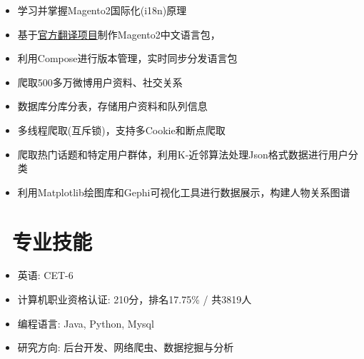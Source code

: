 \documentclass{resume}
\begin{document}
    \begin{onehalfspacing}
        \begin{itemize}
            \item 学习并掌握Magento2国际化(i18n)原理
            \item 基于\href{https://crowdin.com/project/magento-2/zh-CN}{官方翻译项目}制作Magento2中文语言包，
            \item 利用Compose进行版本管理，实时同步分发语言包
        \end{itemize}
    \end{onehalfspacing}

    \begin{onehalfspacing}
        \begin{itemize}
            \item 爬取500多万微博用户资料、社交关系
            \item 数据库分库分表，存储用户资料和队列信息
            \item 多线程爬取(互斥锁)，支持多Cookie和断点爬取
            \item 爬取热门话题和特定用户群体，利用K-近邻算法处理Json格式数据进行用户分类
            \item 利用Matplotlib绘图库和Gephi可视化工具进行数据展示，构建人物关系图谱
        \end{itemize}
    \end{onehalfspacing}
    \blankline{ }

    \section{\faCogs\ 专业技能}
    \begin{itemize}[parsep=0.5ex]
        \item 英语: CET-6
        \item 计算机职业资格认证: 210分，排名17.75\% / 共3819人
        \item 编程语言: Java, Python, Mysql
        \item 研究方向: 后台开发、网络爬虫、数据挖掘与分析
    \end{itemize}
    \blankline{ }
\end{document}
